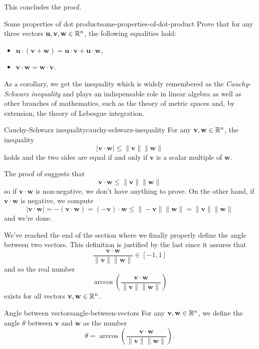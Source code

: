 \begin{thmproof}
 This concludes the proof.
\end{thmproof}

\begin{exercise}{Some properties of dot product}{some-properties-of-dot-product}
 Prove that for any three vectors $\mathbf{u},\mathbf{v},\mathbf{w} \in \mathbb{R}^{n}$,
 the following equalities hold:
 \begin{itemize}
  \item $\mathbf{u} \cdot (\mathbf{v} + \mathbf{w}) = \mathbf{u} \cdot
   \mathbf{v} + \mathbf{u} \cdot \mathbf{w}$,
  \item $\mathbf{v} \cdot \mathbf{w} = \mathbf{w} \cdot \mathbf{v}$.
 \end{itemize}
\end{exercise}

As a corollary, we get the inequality which is widely remembered as the
\emph{Cauchy-Schwarz inequality} and plays an indispensable role in linear
algebra as well as other branches of mathematics, such as the theory of metric
spaces and, by extension, the theory of Lebesgue integration.

\begin{corollary}{Cauchy-Schwarz inequality}{cauchy-schwarz-inequality}
 For any $\mathbf{v},\mathbf{w} \in \mathbb{R}^n$, the inequality
 \[
  |\mathbf{v} \cdot \mathbf{w}| \leq \|\mathbf{v}\|\|\mathbf{w}\|
 \]
 holds and the two sides are equal if and only if $\mathbf{v}$ is a scalar
 multiple of $\mathbf{w}$.
\end{corollary}
\begin{corproof}
 The proof of  suggests that
 \[
  \mathbf{v} \cdot \mathbf{w} \leq \|\mathbf{v}\|\|\mathbf{w}\|
 \]
 so if $\mathbf{v} \cdot \mathbf{w}$ is non-negative, we don't have anything to
 prove. On the other hand, if $\mathbf{v} \cdot \mathbf{w}$ is negative, we
 compute
 \[
  |\mathbf{v} \cdot \mathbf{w}| = -(\mathbf{v} \cdot \mathbf{w}) =
  (-\mathbf{v}) \cdot \mathbf{w} \leq \|-\mathbf{v}\|\|\mathbf{w}\| =
  \|\mathbf{v}\|\|\mathbf{w}\|
 \]
 and we're done.
\end{corproof}

We've reached the end of the section where we finally properly define the angle
between two vectors. This definition is justified by the last
 since it assures that
\[
 \frac{\mathbf{v} \cdot \mathbf{w}}{\|\mathbf{v}\|\|\mathbf{w}\|} \in [-1,1]
\]
and so the real number
\[
 \arccos \left( \frac{\mathbf{v} \cdot \mathbf{w}}{\|\mathbf{v}\|\|\mathbf{w}\|}
 \right)
\]
exists for all vectors $\mathbf{v},\mathbf{w} \in \mathbb{R}^{n}$.

\begin{definition}{Angle between vectors}{angle-between-vectors}
 For any $\mathbf{v},\mathbf{w} \in \mathbb{R}^{n}$, we define the angle $\theta$
 between $\mathbf{v}$ and $\mathbf{w}$ as the number
 \[
  \theta = \arccos \left( \frac{\mathbf{v} \cdot
  \mathbf{w}}{\|\mathbf{v}\|\|\mathbf{w}\|} \right).
 \]
\end{definition}
